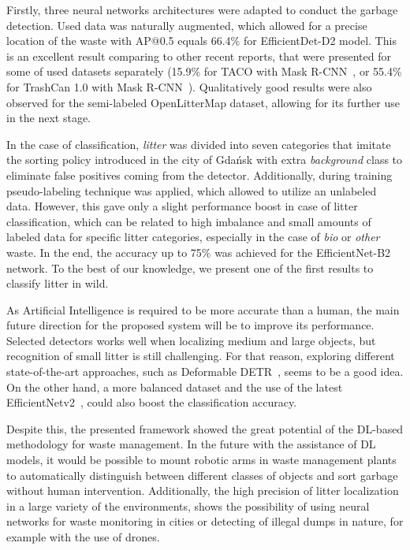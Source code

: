 \documentclass{article}
\begin{document}
Firstly, three neural networks architectures were adapted to conduct the garbage detection. Used data was naturally augmented, which allowed for a precise location of the waste with AP@0.5 equals 66.4\% for EfficientDet-D2 model. This is an excellent result comparing to other recent reports, that were presented for some of used datasets separately (15.9\% for TACO with Mask R-CNN~\cite{proencca2020taco}, or 55.4\% for TrashCan 1.0 with Mask R-CNN~\cite{hong2020trashcan}). Qualitatively good results were also observed for the semi-labeled OpenLitterMap dataset, allowing for its further use in the next stage.

In the case of classification, \textit{litter} was divided into seven categories that imitate the sorting policy introduced in the city of Gdańsk with extra \textit{background} class to eliminate false positives coming from the detector. Additionally, during training pseudo-labeling technique was applied, which allowed to utilize an unlabeled data. However, this gave only a slight performance boost in case of litter classification, which can be related to high imbalance and small amounts of labeled data for specific litter categories, especially in the case of \textit{bio} or \textit{other} waste. In the end, the accuracy up to 75\% was achieved for the EfficientNet-B2 network. To the best of our knowledge, we present one of the first results to classify litter in wild.

As Artificial Intelligence is required to be more accurate than a human, the main future direction for the proposed system will be to improve its performance. Selected detectors works well when localizing medium and large objects, but recognition of small litter is still challenging. For that reason, exploring different state-of-the-art approaches, such as Deformable DETR~\cite{zhu2020deformable}, seems to be a good idea. On the other hand, a more balanced dataset and the use of the latest EfficientNetv2~\cite{tan2021efficientnetv2}, could also boost the classification accuracy.

Despite this, the presented framework showed the great potential of the DL-based methodology for waste management. In the future with the assistance of DL models, it would be possible to mount robotic arms in waste management plants to automatically distinguish between different classes of objects and sort garbage without human intervention. Additionally, the high precision of litter localization in a large variety of the environments, shows the possibility of using neural networks for waste monitoring in cities or detecting of illegal dumps in nature, for example with the use of drones.
\end{document}
